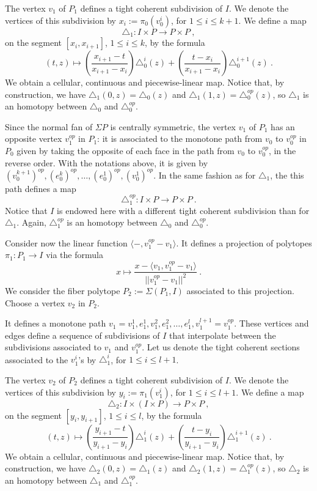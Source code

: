 The vertex $v_1$ of $P_1$ defines a tight coherent subdivision of $I$. We denote the vertices of this subdivision by $x_i:=\pi_0(v_0^i)$, for $1\leq i \leq k+1$. We define a map $$\triangle_1 : I\times P \to P\times P \ , $$ on the segment $[x_i,x_{i+1}]$, $1\leq i \leq k$, by the formula $$(t,z)\mapsto \left(\frac{x_{i+1}-t}{x_{i+1}-x_i}\right)\triangle_0^{i}(z)+\left(\frac{t-x_{i}}{x_{i+1}-x_i}\right)\triangle_0^{i+1}(z) \ . $$ We obtain a cellular, continuous and piecewise-linear map. Notice that, by construction, we have $\triangle_1(0,z)=\triangle_0(z)$ and $\triangle_1(1,z)=\triangle_0^{op}(z)$, so $\triangle_1$ is an homotopy between $\triangle_0$ and $\triangle_0^{op}$. 

Since the normal fan of $\Sigma P$ is centrally symmetric, the vertex $v_1$ of $P_1$ has an opposite vertex $v_1^{op}$ in $P_1$: it is associated to the monotone path from $v_0$ to $v_0^{op}$ in $P_0$ given by taking the opposite of each face in the path from $v_0$ to $v^{op}_0$, in the reverse order. With the notations above, it is given by $(v_0^{k+1})^{op},(e_0^k)^{op},\ldots,(e_0^1)^{op},(v_0^1)^{op}$. In the same fashion as for $\triangle_1$, the this path defines a map $$\triangle_1^{op} : I\times P \to P\times P \ . $$  Notice that $I$ is endowed here with a different tight coherent subdivision than for $\triangle_1$. Again, $\triangle_1^{op}$ is an homotopy between $\triangle_0$ and $\triangle_0^{op}$. 



Consider now the linear function $\langle - , v^{op}_1-v_1 \rangle$. It defines a projection of polytopes $\pi_1 : P_1 \to I$ via the formula
$$ x \mapsto \frac{x-\langle v_1, v^{op}_1-v_1 \rangle}{||v^{op}_1-v_1||^2} \ . $$
We consider the fiber polytope $P_2:=\Sigma(P_1,I)$ associated to this projection. Choose a vertex $v_2$ in $P_2$.

It defines a monotone path $v_1=v_1^1,e_1^1,v_1^2, e_1^2, \ldots,e_1^l, v_1^{l+1}=v^{op}_1$. These vertices and edges define a sequence of subdivisions of $I$ that interpolate between the subdivisions associated to $v_1$ and $v_1^{op}$. Let us denote the tight coherent sections associated to the $v_1^i$'s by $\triangle_1^i$, for $1\leq i \leq l+1$.  

The vertex $v_2$ of $P_2$ defines a tight coherent subdivision of $I$. We denote the vertices of this subdivision by $y_i:=\pi_1(v_1^i)$, for $1\leq i \leq l+1$. We define a map $$\triangle_2 : I\times (I\times P) \to P\times P \ , $$ on the segment $[y_i,y_{i+1}]$, $1\leq i \leq l$, by the formula $$(t,z)\mapsto \left(\frac{y_{i+1}-t}{y_{i+1}-y_i}\right)\triangle_1^{i}(z)+\left(\frac{t-y_{i}}{y_{i+1}-y_i}\right)\triangle_1^{i+1}(z) \ . $$ We obtain a cellular, continuous and piecewise-linear map. Notice that, by construction, we have $\triangle_2(0,z)=\triangle_1(z)$ and $\triangle_2(1,z)=\triangle_1^{op}(z)$, so $\triangle_2$ is an homotopy between $\triangle_1$ and $\triangle_1^{op}$. 

